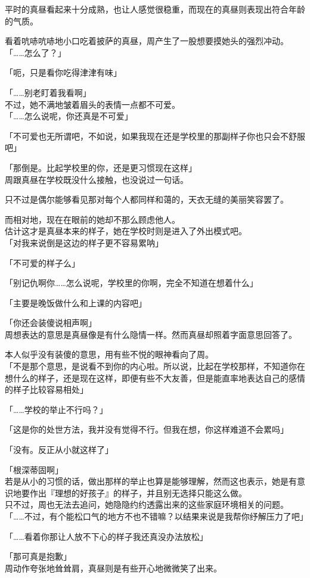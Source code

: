 平时的真昼看起来十分成熟，也让人感觉很稳重，而现在的真昼则表现出符合年龄的气质。

看着吭哧吭哧地小口吃着披萨的真昼，周产生了一股想要摸她头的强烈冲动。\\

「……怎么了？」

「呃，只是看你吃得津津有味」

「……别老盯着我看啊」\\

不过，她不满地皱着眉头的表情一点都不可爱。\\

「……怎么说呢，你还真是不可爱」

「不可爱也无所谓吧，不如说，如果我现在还是学校里的那副样子你也只会不舒服吧」

「那倒是。比起学校里的你，还是更习惯现在这样」\\

周跟真昼在学校既没什么接触，也没说过一句话。

只不过是偶尔能够看见那对每个人都同样和蔼的，天衣无缝的美丽笑容罢了。

而相对地，现在在眼前的她却不那么顾虑他人。\\

估计这才是真昼本来的样子，她在学校时则是进入了外出模式吧。\\

「对我来说倒是这边的样子更不容易累呐」

「不可爱的样子么」

「别记仇啊你……怎么说呢，学校里的你啊，完全不知道在想着什么」

「主要是晚饭做什么和上课的内容吧」

「你还会装傻说相声啊」\\

周想表达的意思是真昼像是有什么隐情一样。然而真昼却照着字面意思回答了。

本人似乎没有装傻的意思，用有些不悦的眼神看向了周。\\

「不是那个意思，是说看不到你的内心啦。所以说，比起在学校那样，不知道你在想什么的样子，还是现在这样，即便有些不大友善，但是能直率地表达自己的感情的样子比较容易相处」

「……学校的举止不行吗？」

「这是你的处世方法，我并没有觉得不行。但我在想，你这样难道不会累吗」

「没有。反正从小就这样了」

「根深蒂固啊」\\

若是从小的习惯的话，做出那样的举止也算是能够理解，然而这也表示，她是有意识地要作出『理想的好孩子』的样子，并且别无选择只能这么做。\\

只不过，周也无法去追问，她隐隐约约透露出来的这些家庭环境相关的问题。\\

「……不过，有个能松口气的地方不也不错嘛？以结果来说是我帮你纾解压力了吧」

「……看着你那让人放不下心的样子我还真没办法放松」

「那可真是抱歉」\\

周动作夸张地耸耸肩，真昼则是有些开心地微微笑了出来。
